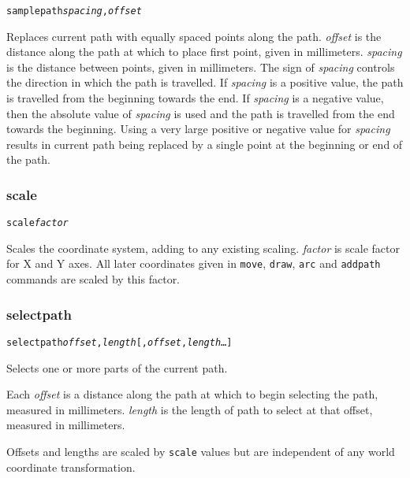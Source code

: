 \begin{alltt}
samplepath \textit{spacing}, \textit{offset}
\end{alltt}

Replaces current path with equally spaced points along the path.
\textit{offset} is the distance along the path at which to place first point,
given in millimeters.  \textit{spacing} is the distance between points, given
in millimeters.  The sign of \textit{spacing} controls the direction in which
the path is travelled.  If \textit{spacing} is a positive value, the path is
travelled from the beginning towards the end.  If \textit{spacing} is a
negative value, then the absolute value of \textit{spacing} is used and the
path is travelled from the end towards the beginning.  Using a very large
positive or negative value for \textit{spacing} results in current path being
replaced by a single point at the beginning or end of the path.

\subsubsection{scale}

\begin{alltt}
scale \textit{factor}
\end{alltt}

Scales the coordinate system, adding to any existing scaling.  \textit{factor}
is scale factor for X and Y axes.  All later coordinates given in
\texttt{move}, \texttt{draw}, \texttt{arc} and \texttt{addpath} commands are
scaled by this factor.

\subsubsection{selectpath}

\begin{alltt}
selectpath \textit{offset}, \textit{length} [, \textit{offset}, \textit{length}  \dots ]
\end{alltt}

Selects one or more parts of the current path.

Each \textit{offset} is a distance along the path at which to begin selecting
the path, measured in millimeters.
\textit{length} is the length of path to select at that offset, measured
in millimeters.

Offsets and lengths are scaled by \texttt{scale} values but are independent of
any world coordinate transformation.

